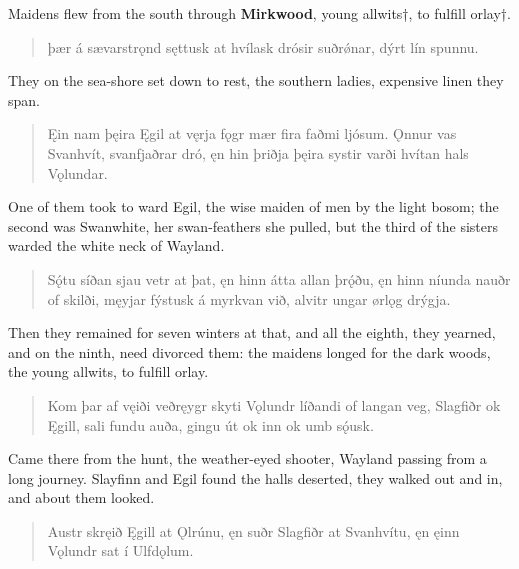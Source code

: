 \bvb Maidens flew from the south through \textbf{Mirkwood}, young allwits†, to fulfill orlay†. \\

\begin{verse}
\bva þær á sævarstrǫnd \hld sęttusk at hvílask
drósir suðrǿnar, \hld dýrt lín spunnu. \\%
\end{verse}

\bvb They on the sea-shore set down to rest, the southern ladies, expensive linen they span. \\

\begin{verse}
\bva Ęin nam þęira \hld Ęgil at vęrja
fǫgr mær fira \hld faðmi ljósum.
Ǫnnur vas Svanhvít, \hld svanfjaðrar dró,
ęn hin þriðja \hld þęira systir
varði hvítan \hld hals Vǫlundar. \\%
\end{verse}

\bvb One of them took to ward Egil, the wise maiden of men by the light bosom; the second was Swanwhite, her swan-feathers she pulled, but the third of the sisters warded the white neck of Wayland. \\

\begin{verse}
\bva Sǫ́tu síðan \hld sjau vetr at þat,
ęn hinn átta \hld allan þrǫ́ðu,
ęn hinn níunda \hld nauðr of skilði,
męyjar fýstusk \hld á myrkvan við,
alvitr ungar \hld ørlǫg drýgja. \\%
\end{verse}

\bvb Then they remained for seven winters at that, and all the eighth, they yearned, and on the ninth, need divorced them: the maidens longed for the dark woods, the young allwits, to fulfill orlay. \\

\begin{verse}
\bva Kom þar af vęiði \hld veðręygr skyti
Vǫlundr líðandi \hld of langan veg,
Slagfiðr ok Ęgill, \hld sali fundu auða,
gingu út ok inn \hld ok umb sǫ́usk. \\%
\end{verse}

\bvb Came there from the hunt, the weather-eyed shooter, Wayland passing from a long journey. Slayfinn and Egil found the halls deserted, they walked out and in, and about them looked. \\

\begin{verse}
\bva Austr skręið Ęgill \hld at Ǫlrúnu,
ęn suðr Slagfiðr \hld at Svanhvítu,
ęn ęinn Vǫlundr \hld sat í Ulfdǫlum. \\%
\end{verse}

